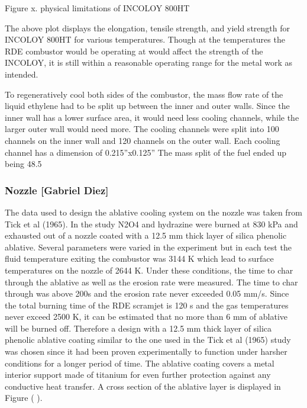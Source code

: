 Figure x. physical limitations of INCOLOY 800HT


The above plot displays the elongation, tensile strength, and yield strength for INCOLOY 800HT for various temperatures. Though at the temperatures the RDE combustor would be operating at would affect the strength of the INCOLOY, it is still within a reasonable operating range for the metal work as intended.

To regeneratively cool both sides of the combustor, the mass flow rate of the liquid ethylene had to be split up between the inner and outer walls. Since the inner wall has a lower surface area, it would need less cooling channels, while the larger outer wall would need more. The cooling channels were split into 100 channels on the inner wall and 120 channels on the outer wall. Each cooling channel has a dimension of 0.215”x0.125” The mass split of the fuel ended up being 48.5%

\subsubsection{Nozzle [Gabriel Diez]}

The data used to design the ablative cooling system on the nozzle was taken from Tick et al (1965). In the study N2O4 and hydrazine were burned at 830 kPa and exhausted out of a nozzle coated with a 12.5 mm thick layer of silica phenolic ablative. Several parameters were varied in the experiment but in each test the fluid temperature exiting the combustor was 3144 K which lead to surface temperatures on the nozzle of 2644 K. Under these conditions, the time to char through the ablative as well as the erosion rate were measured. The time to char through was above 200s and the erosion rate never exceeded 0.05 mm/s. Since the total burning time of the RDE scramjet is 120 s and the gas temperatures never exceed 2500 K, it can be estimated that no more than 6 mm of ablative will be burned off. Therefore a design with a 12.5 mm thick layer of silica phenolic ablative coating similar to the one used in the Tick et al (1965) study was chosen since it had been proven experimentally to function under harsher conditions for a longer period of time. The ablative coating covers a metal interior support made of titanium for even further protection against any conductive heat transfer. A cross section of the ablative layer is displayed in Figure ( ).

